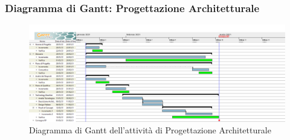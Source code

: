 \newpage
\subsubsection{Diagramma di Gantt: Progettazione Architetturale}

\begin{figure}[ht]
    \centering
    \includegraphics[width=\textwidth]{Immagini/GanttProgettazioneArchitetturale}
    \caption{Diagramma di Gantt dell'attività di Progettazione Architetturale}
\end{figure}